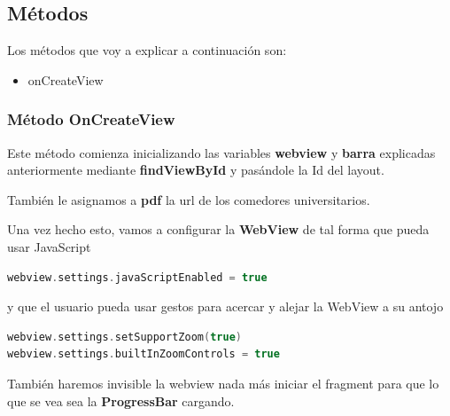 \documentclass[a4paper,11pt]{article}
\begin{document}
\subsection{Métodos}

\vspace{5 mm}

Los métodos que voy a explicar a continuación son:

\begin{itemize}
\item{onCreateView}
\end{itemize}

\vspace{5 mm}

\subsubsection{Método OnCreateView}

\vspace{5 mm}

Este método comienza inicializando las variables \textbf{webview} y \textbf{barra} explicadas anteriormente mediante \textbf{findViewById} y pasándole la Id del layout.

También le asignamos a \textbf{pdf} la url de los comedores universitarios.

\vspace{5 mm}

Una vez hecho esto, vamos a configurar la \textbf{WebView} de tal forma que pueda usar JavaScript 

\vspace{5 mm}


\begin{lstlisting}[language=Kotlin]
webview.settings.javaScriptEnabled = true
\end{lstlisting}

\vspace{5 mm}


y que el usuario pueda usar gestos para acercar y alejar la WebView a su antojo 

\vspace{5 mm}


\begin{lstlisting}[language=Kotlin]
webview.settings.setSupportZoom(true)
webview.settings.builtInZoomControls = true
\end{lstlisting}

\vspace{5 mm}

También haremos invisible la webview nada más iniciar el fragment para que lo que se vea sea la \textbf{ProgressBar} cargando.
\end{document}
